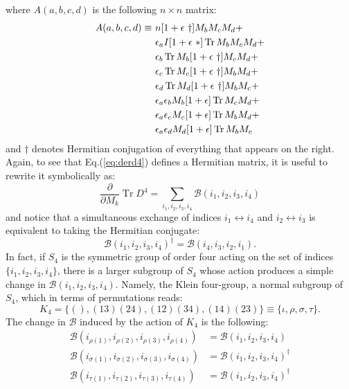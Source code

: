 \documentclass[12pt,a4paper]{article}
\DeclareMathOperator{\Tr}{Tr}
\begin{document}
where $A(a, b, c, d )$ is the following $n \times n$ matrix:
\begin{align}
A(a,b,c,d) \equiv \ &n [1+\epsilon \ \dagger] M_b M_c M_d + \notag \\
&\epsilon_a I [1 + \epsilon \ *] \Tr M_b M_c M_d  + \notag \\
&\epsilon_b \Tr M_b [1 + \epsilon \ \dagger] M_c M_d + \notag \\
&\epsilon_c \Tr M_c [1 + \epsilon \ \dagger] M_b M_d + \notag \\
&\epsilon_d \Tr M_d [1 + \epsilon \ \dagger] M_b M_c + \notag \\
&\epsilon_a \epsilon_b M_b [1 + \epsilon] \Tr M_c M_d + \notag \\
&\epsilon_a \epsilon_c M_c [1 + \epsilon] \Tr M_b M_d + \notag \\
&\epsilon_a \epsilon_d M_d [1 + \epsilon] \Tr M_b M_c
\end{align}
and $\dagger$ denotes Hermitian conjugation of everything that appears on the right. Again, to see that Eq.(\ref{eq:derd4}) defines a Hermitian matrix, it is useful to rewrite it symbolically as:
\begin{equation}\label{eq:symb}
\frac{\partial}{\partial M_k} \Tr D^4 = \sum_{i_1, i_2, i_3, i_4} \mathcal{B}(i_1, i_2, i_3, i_4)
\end{equation}
and notice that a simultaneous exchange of indices $i_1 \leftrightarrow i_4$ and $i_2 \leftrightarrow i_3$ is equivalent to taking the Hermitian conjugate:
\begin{equation}\label{eq:BBd}
\mathcal{B}(i_1, i_2, i_3, i_4)^{\dagger} = \mathcal{B}(i_4, i_3, i_2, i_1).
\end{equation}
In fact, if $S_4$ is the symmetric group of order four acting on the set of indices $\{i_1, i_2, i_3, i_4\}$, there is a larger subgroup of $S_4$ whose action produces a simple change in $\mathcal{B}(i_1, i_2, i_3, i_4)$. Namely, the Klein four-group, a normal subgroup of $S_4$, which in terms of permutations reads:
\begin{equation}
K_4 = \{(), (13)(24), (12)(34), (14)(23)\} \equiv \{\iota, \rho, \sigma, \tau \}.
\end{equation}
The change in $\mathcal{B}$ induced by the action of $K_4$ is the following:
\begin{align}
\mathcal{B}(i_{\rho(1)}, i_{\rho(2)}, i_{\rho(3)}, i_{\rho(4)}) &= \mathcal{B}(i_1, i_2, i_3, i_4) \\
\mathcal{B}(i_{\sigma(1)}, i_{\sigma(2)}, i_{\sigma(3)}, i_{\sigma(4)}) &= \mathcal{B}(i_1, i_2, i_3, i_4)^{\dagger} \\
\mathcal{B}(i_{\tau(1)}, i_{\tau(2)}, i_{\tau(3)}, i_{\tau(4)}) &= \mathcal{B}(i_1, i_2, i_3, i_4)^{\dagger}
\end{align}
\end{document}
